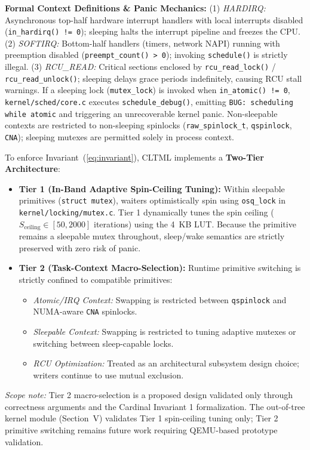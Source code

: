 \documentclass[conference]{IEEEtran}
\begin{document}
\textbf{Formal Context Definitions \& Panic Mechanics:} (1) \textit{HARDIRQ:} Asynchronous top-half hardware interrupt handlers with local interrupts disabled (\texttt{in\_hardirq() != 0}); sleeping halts the interrupt pipeline and freezes the CPU. (2) \textit{SOFTIRQ:} Bottom-half handlers (timers, network NAPI) running with preemption disabled (\texttt{preempt\_count() > 0}); invoking \texttt{schedule()} is strictly illegal. (3) \textit{RCU\_READ:} Critical sections enclosed by \texttt{rcu\_read\_lock()} / \texttt{rcu\_read\_unlock()}; sleeping delays grace periods indefinitely, causing RCU stall warnings. If a sleeping lock (\texttt{mutex\_lock}) is invoked when \texttt{in\_atomic() != 0}, \texttt{kernel/sched/core.c} executes \texttt{schedule\_debug()}, emitting \texttt{BUG: scheduling while atomic} and triggering an unrecoverable kernel panic. Non-sleepable contexts are restricted to non-sleeping spinlocks (\texttt{raw\_spinlock\_t}, \texttt{qspinlock}, \texttt{CNA}); sleeping mutexes are permitted solely in process context.

To enforce Invariant~(\ref{eq:invariant}), CLTML implements a \textbf{Two-Tier Architecture}:
\begin{itemize}
    \item \textbf{Tier 1 (In-Band Adaptive Spin-Ceiling Tuning):} Within sleepable primitives (\texttt{struct mutex}), waiters optimistically spin using \texttt{osq\_lock} in \texttt{kernel/locking/mutex.c}. Tier 1 dynamically tunes the spin ceiling ($S_{\text{ceiling}} \in [50, 2000]$ iterations) using the 4~KB LUT. Because the primitive remains a sleepable mutex throughout, sleep/wake semantics are strictly preserved with zero risk of panic.
    \item \textbf{Tier 2 (Task-Context Macro-Selection):} Runtime primitive switching is strictly confined to compatible primitives:
    \begin{itemize}
        \item \textit{Atomic/IRQ Context:} Swapping is restricted between \texttt{qspinlock} and NUMA-aware \texttt{CNA} spinlocks.
        \item \textit{Sleepable Context:} Swapping is restricted to tuning adaptive mutexes or switching between sleep-capable locks.
        \item \textit{RCU Optimization:} Treated as an architectural subsystem design choice; writers continue to use mutual exclusion.
    \end{itemize}
\end{itemize}
\textit{Scope note:} Tier 2 macro-selection is a proposed design validated only through correctness arguments and the Cardinal Invariant 1 formalization. The out-of-tree kernel module (Section~V) validates Tier 1 spin-ceiling tuning only; Tier 2 primitive switching remains future work requiring QEMU-based prototype validation.
\end{document}
